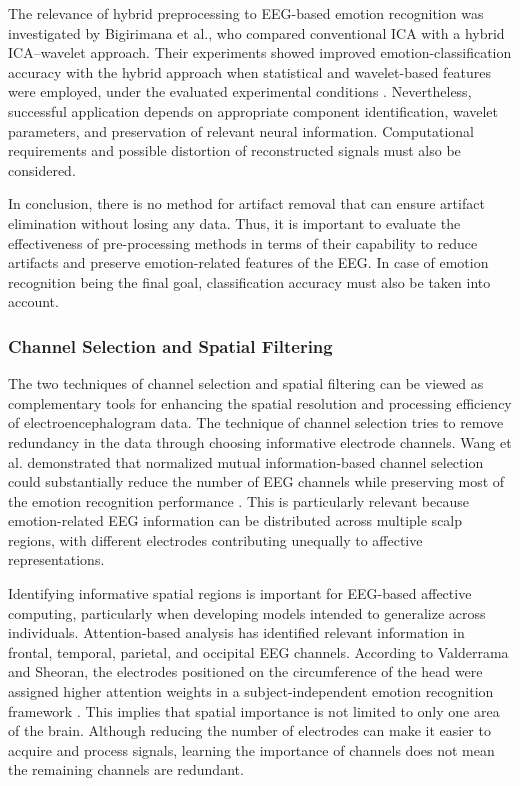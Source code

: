 \documentclass[ASNA,twocolumn]{USG}
\begin{document}
The relevance of hybrid preprocessing to EEG-based emotion recognition was investigated by Bigirimana et al., who compared conventional ICA with a hybrid ICA--wavelet approach. Their experiments showed improved emotion-classification accuracy with the hybrid approach when statistical and wavelet-based features were employed, under the evaluated experimental conditions \cite{Bigirimana2017}. Nevertheless, successful application depends on appropriate component identification, wavelet parameters, and preservation of relevant neural information. Computational requirements and possible distortion of reconstructed signals must also be considered.

In conclusion, there is no method for artifact removal that can ensure artifact elimination without losing any data. Thus, it is important to evaluate the effectiveness of pre-processing methods in terms of their capability to reduce artifacts and preserve emotion-related features of the EEG. In case of emotion recognition being the final goal, classification accuracy must also be taken into account.


\subsubsection{Channel Selection and Spatial Filtering}

The two techniques of channel selection and spatial filtering can be viewed as complementary tools for enhancing the spatial resolution and processing efficiency of electroencephalogram data. The technique of channel selection tries to remove redundancy in the data through choosing informative electrode channels. Wang et al. demonstrated that normalized mutual information-based channel selection could substantially reduce the number of EEG channels while preserving most of the emotion recognition performance \cite{wang2019channel}. This is particularly relevant because emotion-related EEG information can be distributed across multiple scalp regions, with different electrodes contributing unequally to affective representations.

Identifying informative spatial regions is important for EEG-based affective computing, particularly when developing models intended to generalize across individuals. Attention-based analysis has identified relevant information in frontal, temporal, parietal, and occipital EEG channels. According to Valderrama and Sheoran, the electrodes positioned on the circumference of the head were assigned higher attention weights in a subject-independent emotion recognition framework \cite{valderrama2025identifying}. This implies that spatial importance is not limited to only one area of the brain. Although reducing the number of electrodes can make it easier to acquire and process signals, learning the importance of channels does not mean the remaining channels are redundant.
\end{document}
